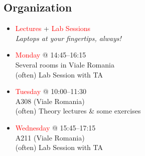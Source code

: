 \documentclass[t,handout,9pt]{beamer}
\begin{document}
\subsection{Organization}
\begin{frame}
\vfill
\begin{itemize}
	\item \textcolor{red}{Lectures} + \textcolor{red}{Lab Sessions}\\
	\qquad \textit{Laptops at your fingertips, always!}
	\vfill
	\item \textcolor{red}{Monday} @ 14:45--16:15\\
	\qquad Several rooms in Viale Romania\\
	\qquad (often) Lab Session with TA
	\vfill
	\item \textcolor{red}{Tuesday} @ 10:00--11:30\\
	\qquad A308 (Viale Romania)\\
	\qquad (often) Theory lectures \& some exercises
	\vfill
	\item \textcolor{red}{Wednesday} @ 15:45--17:15\\
	\qquad A211 (Viale Romania)\\
	\qquad (often) Lab Session with TA
\end{itemize}
\vfill
\end{frame}
%
\end{document}
